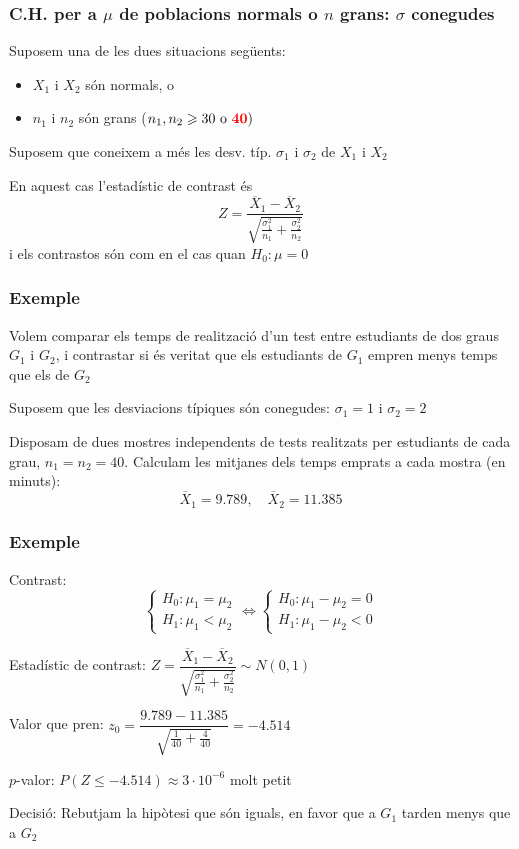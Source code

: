 \documentclass[12pt,t]{beamer}
\newcommand{\red}[1]{\textcolor{red}{#1}}
\renewcommand{\emph}[1]{{\color{red}#1}}
\renewcommand{\leq}{\leqslant}
\renewcommand{\geq}{\geqslant}
\theoremstyle{plain}
\theoremstyle{definition}
\begin{document}
\begin{frame}
\frametitle{C.H. per a $\mu$ de  poblacions normals o $n$ grans: $\sigma$ conegudes}

Suposem una de les dues situacions següents:
\begin{itemize}
\item $X_1$ i $X_2$ són normals, o

\item $n_1$ i $n_2$ són grans ($n_1,n_2\geq 30\mbox{ o } \red{\bf 40})$
\end{itemize}
\medskip

Suposem que coneixem a més les desv. típ. $\sigma_1$ i $\sigma_2$ de $X_1$ i $X_2$
\medskip

En aquest cas l'estadístic de contrast és
$$
Z=\frac{\overline{X}_1-\overline{X}_2}{\sqrt{\frac{\sigma_1^2}{n_1}+\frac{\sigma_2^2}{n_2}}}
$$
i els contrastos són com en el cas quan $H_0:\mu=0$
\end{frame}

\begin{frame}
\frametitle{Exemple}

Volem comparar els temps de realització d'un test entre estudiants de dos graus $G_1$ i $G_2$, i contrastar si és veritat que els estudiants de $G_1$ empren menys temps que els de $G_2$
\medskip

Suposem que les desviacions típiques són conegudes: $\sigma_1=1$ i $\sigma_2=2$
\medskip

Disposam de dues mostres independents de tests realitzats per estudiants de cada grau, $n_1=n_2=40$. Calculam les mitjanes dels temps emprats a cada mostra (en minuts):
$$
\overline{X}_1= 9.789,\quad  \overline{X}_2=11.385
$$

\end{frame}




\begin{frame}
\frametitle{Exemple}

\emph{Contrast}:
$$
\left\{\begin{array}{l}
H_0:\mu_1=\mu_2\\
H_1:\mu_1< \mu_2
\end{array}\right.
\Longleftrightarrow
\left\{\begin{array}{l}
H_0:\mu_1-\mu_2=0\\
H_1:\mu_1- \mu_2<0
\end{array}\right.
$$

\emph{Estadístic de contrast}: $Z=\dfrac{\overline{X}_1-\overline{X}_2}{\sqrt{\frac{\sigma_1^2}{n_1}+\frac{\sigma_2^2}{n_2}}}\sim N(0,1)$
\medskip

\emph{Valor que pren}: $z_0=\dfrac{9.789-11.385}{\sqrt{\frac{1}{40}+\frac{4}{40}}}=-4.514$
\medskip

\emph{$p$-valor}: $P(Z\leq -4.514)\approx 3\cdot 10^{-6}$ molt petit
\medskip

\emph{Decisió}: Rebutjam la hipòtesi que són iguals, en favor que a $G_1$ tarden menys que a $G_2$
\end{frame}
\end{document}
